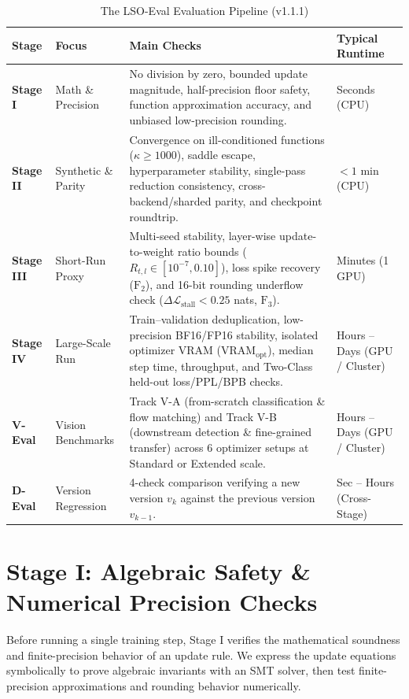 \documentclass[11pt,a4paper]{article}
\renewcommand{\_}{\origunderscore\allowbreak}
\begin{document}
\begin{table}[htbp]
\centering
\caption{The LSO-Eval Evaluation Pipeline (v1.1.1)}
\label{tab:pipeline}
\vspace{0.3em}
\small
\begin{tabularx}{\textwidth}{@{}l l Y l@{}}
\toprule
\textbf{Stage} & \textbf{Focus} & \textbf{Main Checks} & \textbf{Typical Runtime} \\
\midrule
\textbf{Stage I} & Math \& Precision & No division by zero, bounded update magnitude, half-precision floor safety, function approximation accuracy, and unbiased low-precision rounding. & Seconds (CPU) \\[0.35em]
\textbf{Stage II} & Synthetic \& Parity & Convergence on ill-conditioned functions ($\kappa \ge 1000$), saddle escape, hyperparameter stability, single-pass reduction consistency, cross-backend/sharded parity, and checkpoint roundtrip. & $< 1$ min (CPU) \\[0.35em]
\textbf{Stage III} & Short-Run Proxy & Multi-seed stability, layer-wise update-to-weight ratio bounds ($R_{t,l} \in [10^{-7}, 0.10]$), loss spike recovery ($\text{F}_2$), and 16-bit rounding underflow check ($\Delta\mathcal{L}_{\text{stall}} < 0.25$ nats, $\text{F}_3$). & Minutes (1 GPU) \\[0.35em]
\textbf{Stage IV} & Large-Scale Run & Train--validation deduplication, low-precision BF16/FP16 stability, isolated optimizer VRAM ($\text{VRAM}_{\text{opt}}$), median step time, throughput, and Two-Class held-out loss/PPL/BPB checks. & Hours -- Days (GPU / Cluster) \\
\midrule
\textbf{V-Eval} & Vision Benchmarks & Track V-A (from-scratch classification \& flow matching) and Track V-B (downstream detection \& fine-grained transfer) across 6 optimizer setups at Standard or Extended scale. & Hours -- Days (GPU / Cluster) \\[0.35em]
\textbf{D-Eval} & Version Regression & 4-check comparison verifying a new version $v_k$ against the previous version $v_{k-1}$. & Sec -- Hours (Cross-Stage) \\
\bottomrule
\end{tabularx}
\end{table}

\section{Stage I: Algebraic Safety \& Numerical Precision Checks}
\noindent
Before running a single training step, Stage I verifies the mathematical soundness and finite-precision behavior of an update rule. We express the update equations symbolically to prove algebraic invariants with an SMT solver, then test finite-precision approximations and rounding behavior numerically.
\end{document}
